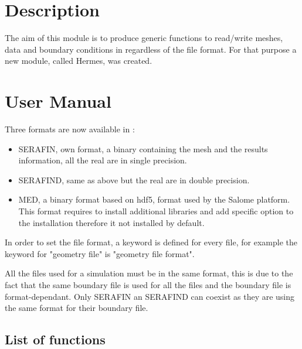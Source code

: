 \chapter{Description}
%
The aim of this module is to produce generic functions to read/write meshes,
data and boundary conditions in \telemacsystem regardless of the file format. For that
purpose a new module, called Hermes, was created.
%
\chapter{User Manual}
%
Three formats are now available in \telemacsystem:
\begin{itemize}
\item SERAFIN, \telemacsystem own format, a binary containing the mesh and the results
information, all the real are in single precision.
\item SERAFIND, same as above but the real are in double precision.
\item MED, a binary format based on hdf5, format used by the Salome platform.
This format requires to install additional libraries and add specific option
to the \telemacsystem installation therefore it not installed by default.
\end{itemize}

In order to set the file format, a keyword is defined for every file, for
example the keyword for "geometry file" is "geometry file format".

All the files used for a simulation must be in the same format, this is due to
the fact that the same boundary file is used for all the files and the boundary
file is format-dependant. Only SERAFIN an SERAFIND can coexist as they are
using the same format for their boundary file.
\section{List of functions}
\label{listfunc}
